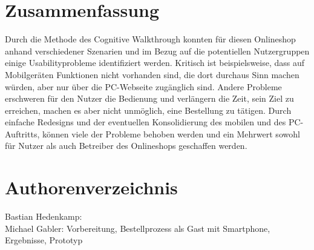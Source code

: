 \documentclass[	12pt, 
				a4paper, 
				BCOR=10mm, %
				DIV=12, 
				parskip=half, %
				headings=small, %
				twoside, %
				ngerman,
				bibliography=totoc,index=totoc, listof=totoc,
				numbers=noendperiod
				]{scrbook} %
\theoremstyle{plain}%
\theoremstyle{definition}
\theoremstyle{remark}
\begin{document}
\chapter{Zusammenfassung}
Durch die Methode des Cognitive Walkthrough konnten für diesen Onlineshop anhand verschiedener Szenarien und im Bezug auf die potentiellen Nutzergruppen einige Usabilityprobleme identifiziert werden. Kritisch ist beispielsweise, dass auf Mobilgeräten Funktionen nicht vorhanden sind, die dort durchaus Sinn machen würden, aber nur über die PC-Webseite zugänglich sind. Andere Probleme erschweren für den Nutzer die Bedienung und verlängern die Zeit, sein Ziel zu erreichen, machen es aber nicht unmöglich, eine Bestellung zu tätigen. Durch einfache Redesigns und der eventuellen Konsolidierung des mobilen und des PC-Auftritts, können viele der Probleme behoben werden und ein Mehrwert sowohl für Nutzer als auch Betreiber des Onlineshops geschaffen werden.


\newpage
 \printbibliography	%

\appendix 				%

\newpage
\chapter{Authorenverzeichnis}
Bastian Hedenkamp:\\
Michael Gabler: Vorbereitung, Bestellprozess als Gast mit Smartphone, Ergebnisse, Prototyp 
\end{document}

